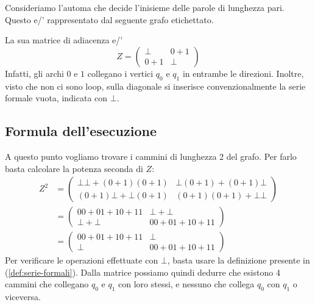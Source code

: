\begin{exam}
    Consideriamo l'automa che decide l'inisieme delle parole di lunghezza pari. 
    Questo e/' rappresentato dal seguente grafo etichettato.
\begin{center}
\end{center}
La sua matrice di adiacenza e/'
\[
Z=
\begin{pmatrix}
   \bot & 0 + 1
    \\
    0+1 & \bot
\end{pmatrix}
\]
Infatti, gli archi $0$ e $1$ collegano i vertici 
$q_0$ e $q_1$ in entrambe le direzioni.
Inoltre, visto che non ci sono loop, 
sulla diagonale si inserisce convenzionalmente la serie formale vuota, 
indicata con $\bot$.

\subsection{Formula dell'esecuzione}
A questo punto vogliamo trovare i cammini di lunghezza 2 del grafo.
Per farlo basta calcolare la potenza seconda di $Z$:
\begin{align*}
Z^2&=
\begin{pmatrix}
    \bot \bot + (0+1)(0+1) & \bot(0+1) + (0+1)\bot
    \\[6pt]
    (0+1)\bot + \bot(0+1) & (0+1)(0+1) + \bot \bot
\end{pmatrix}
\\ &=
\begin{pmatrix}
    00+ 01+ 10+11 & \bot + \bot
    \\[6pt]
    \bot + \bot &  00+ 01+ 10+11
\end{pmatrix}
\\ &=
\begin{pmatrix}
    00+ 01+ 10+11 &  \bot
    \\[6pt]
    \bot &  00+ 01+ 10+11
\end{pmatrix}
\end{align*}
Per verificare le operazioni effettuate con $\bot$, 
basta usare la definizione presente in (\ref{def:serie-formali}).
Dalla matrice possiamo quindi dedurre che
esistono 4 cammini che collegano $q_0$ e $q_1$ con loro stessi,
e nessuno che collega $q_0$ con $q_1$ o viceversa.
\end{exam}


